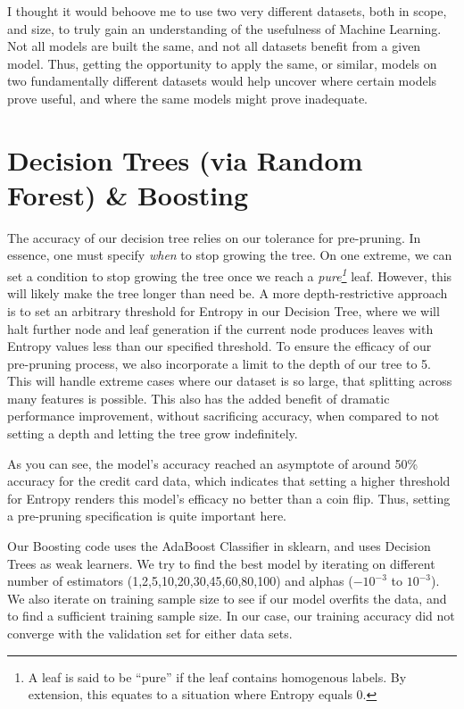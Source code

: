 \documentclass[letterpaper,12pt]{article}
\begin{document}
I thought it would behoove me to use two very different datasets, both in scope, and size, to truly gain an understanding of the usefulness of Machine Learning.  Not all models are built the same, and not all datasets benefit from a given model.  Thus, getting the opportunity to apply the same, or similar, models on two fundamentally different datasets would help uncover where certain models prove useful, and where the same models might prove inadequate.  

\section{Decision Trees (via Random Forest) \& Boosting}

The accuracy of our decision tree relies on our tolerance for pre-pruning.  In essence, one must specify \emph{when} to stop growing the tree.  On one extreme, we can set a condition to stop growing the tree once we reach a \emph{pure\footnote{A leaf is said to be ``pure'' if the leaf contains homogenous labels.  By extension, this equates to a situation where Entropy equals 0.}} leaf.  However, this will likely make the tree longer than need be.  A more depth-restrictive approach is to set an arbitrary threshold for Entropy in our Decision Tree, where we will halt further node and leaf generation if the current node produces leaves with Entropy values less than our specified threshold.  To ensure the efficacy of our pre-pruning process, we also incorporate a limit to the depth of our tree to 5.  This will handle extreme cases where our dataset is so large, that splitting across many features is possible. This also has the added benefit of dramatic performance improvement, without sacrificing accuracy, when compared to not setting a depth and letting the tree grow indefinitely.

As you can see, the model's accuracy reached an asymptote of around 50\% accuracy for the credit card data, which indicates that setting a higher threshold for Entropy renders this model's efficacy no better than a coin flip. Thus, setting a pre-pruning specification is quite important here. 

Our Boosting code uses the AdaBoost Classifier in sklearn, and uses Decision Trees as weak learners.  We try to find the best model by iterating on different number of estimators (1,2,5,10,20,30,45,60,80,100) and alphas ($-10^{-3}$ to $10^{-3}$). We also iterate on training sample size to see if our model overfits the data, and to find a sufficient training sample size.  In our case, our training accuracy did not converge with the validation set for either data sets.
\end{document}
